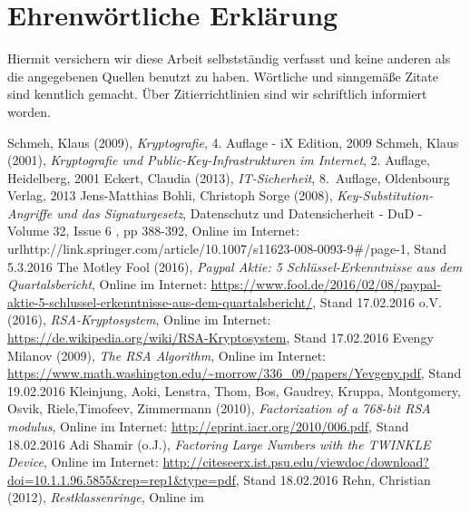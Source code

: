 \documentclass[a4paper, fontsize=12pt, parskip=full, toc=bibliographynumbered]{scrreprt}
\begin{document}





\author{}
\chapter{Ehrenwörtliche Erklärung}

Hiermit versichern wir diese Arbeit selbstständig verfasst und keine
anderen als die angegebenen Quellen benutzt zu haben.  Wörtliche und
sinngemäße Zitate sind kenntlich gemacht.  Über Zitierrichtlinien
sind wir schriftlich informiert worden.

\renewcommand{\bibname}{Quellenverzeichnis}
\begin{thebibliography}{9}
 Schmeh, Klaus (2009), \emph{Kryptografie}, 4. Auflage - iX Edition, 2009
 Schmeh, Klaus (2001), \emph{Kryptografie und Public-Key-Infrastrukturen im Internet}, 2. Auflage, Heidelberg, 2001
 Eckert, Claudia (2013), \emph{IT-Sicherheit},
  8.~Auflage, Oldenbourg Verlag, 2013
 Jens-Matthias Bohli, Christoph Sorge (2008), \emph{Key-Substitution-Angriffe und das Signaturgesetz}, Datenschutz und Datensicherheit - DuD - Volume 32, Issue 6 , pp 388-392, Online im Internet: url{http://link.springer.com/article/10.1007/s11623-008-0093-9\#/page-1}, Stand 5.3.2016
 The Motley Fool (2016), \emph{Paypal Aktie: 5 Schlüssel-Erkenntnisse aus dem Quartalsbericht}, Online im
  Internet: \url{https://www.fool.de/2016/02/08/paypal-aktie-5-schlussel-erkenntnisse-aus-dem-quartalsbericht/}, Stand 17.02.2016
 o.V. (2016), \emph{RSA-Kryptosystem}, Online im
  Internet: \url{https://de.wikipedia.org/wiki/RSA-Kryptosystem}, Stand 17.02.2016
 Evengy Milanov (2009), \emph{The RSA Algorithm}, Online im
  Internet: \url{https://www.math.washington.edu/~morrow/336_09/papers/Yevgeny.pdf}, Stand 19.02.2016
 Kleinjung, Aoki, Lenstra, Thom, Bos, Gaudrey, Kruppa, Montgomery, Osvik, Riele,Timofeev, Zimmermann (2010), \emph{Factorization of a 768-bit RSA modulus}, Online im
  Internet: \url{http://eprint.iacr.org/2010/006.pdf}, Stand 18.02.2016
 Adi Shamir (o.J.), \emph{Factoring Large Numbers with the TWINKLE Device}, Online im
  Internet: \url{http://citeseerx.ist.psu.edu/viewdoc/download?doi=10.1.1.96.5855&rep=rep1&type=pdf}, Stand 18.02.2016
 Rehn, Christian (2012), \emph{Restklassenringe}, Online im

\end{thebibliography}
\end{document}
